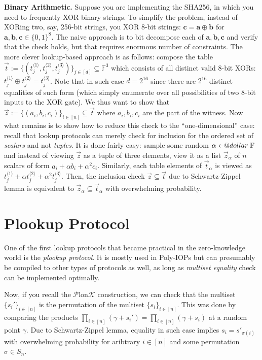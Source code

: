 \documentclass{lookup-template}
\makeatletter
\newcommand\leftarrowS{\leftarrow\joinrel\smalldollar}
\newcommand{\smalldollar}{\mathrel{\mathpalette\small@dollar\relax}}
\newcommand{\small@dollar}[2]{%
  \vcenter{\hbox{%
    $#1\textnormal{\fontsize{0.7\dimexpr\f@size pt}{0}\selectfont\$}$%
  }}%
}
\makeatother
\begin{document}
\textbf{Binary Arithmetic.} Suppose you are implementing the SHA256, in which
you need to frequently XOR binary strings. To simplify the problem, instead of
XORing two, say, 256-bit strings, you XOR 8-bit strings: $\mathbf{c} =
\mathbf{a} \oplus \mathbf{b}$ for $\mathbf{a},\mathbf{b},\mathbf{c} \in
\{0,1\}^8$. The naive approach is to bit decompose each of
$\mathbf{a},\mathbf{b},\mathbf{c}$ and verify that the check holds, but that
requires enormous number of constraints. The more clever lookup-based approach
is as follows: compose the table $\vec{t} := \{(t_j^{\langle 1
\rangle},t_j^{\langle 2 \rangle},t_j^{\langle 3 \rangle})\}_{j \in [d]}
\subseteq \mathbb{F}^3$ which consists of all distinct valid 8-bit XORs:
$t_j^{\langle 1 \rangle} \oplus t_j^{\langle 2 \rangle}=t_j^{\langle 3
\rangle}$. Note that in such case $d=2^{16}$ since there are $2^{16}$ distinct
equalities of such form (which simply enumerate over all possibilities of two
8-bit inputs to the XOR gate). We thus want to show that $\vec{z} :=
\{(a_i,b_i,c_i)\}_{i \in [n]} \subseteq \vec{t}$ where $a_i,b_i,c_i$ are the
part of the witness. Now what remains is to show how to reduce this check to the
``one-dimensional'' case: recall that lookup protocols can merely check for
inclusion for the ordered set of \textit{scalars} and not \textit{tuples}. It is
done fairly easy: sample some random $\alpha \leftarrowS \mathbb{F}$ and instead
of viewing $\vec{z}$ as a tuple of three elements, view it as a list
$\vec{z}_{\alpha}$ of $n$ scalars of form $a_i+\alpha b_i+\alpha^2 c_i$.
Similarly, each table elements of $\vec{t}_{\alpha}$ is viewed as $t_j^{\langle
1 \rangle} + \alpha t_j^{\langle 2 \rangle} + \alpha^2 t_j^{\langle 3 \rangle}$.
Then, the inclusion check $\vec{z} \subseteq \vec{t}$ due to Schwartz-Zippel
lemma is equivalent to $\vec{z}_{\alpha} \subseteq \vec{t}_{\alpha}$ with
overwhelming probability.

\section*{Plookup Protocol}

One of the first lookup protocols that became practical in the zero-knowledge
world is the \textit{plookup protocol}. It is mostly used in Poly-IOPs but can
presumably be compiled to other types of protocols as well, as long as
\textit{multiset equality} check can be implemented optimally.

Now, if you recall the $\mathcal{P}$lon$\mathcal{K}$ construction, we can check
that the multiset $\{s_i'\}_{i \in [n]}$ is the permutation of the multiset
$\{s_i\}_{i \in [n]}$. This was done by comparing the products $\prod_{i \in
[n]}(\gamma+s_i')=\prod_{i \in [n]}(\gamma+s_i)$ at a random point $\gamma$. Due
to Schwartz-Zippel lemma, equality in such case implies $s_{i}=s'_{\sigma(i)}$
with overwhelming probability for aribtrary $i \in [n]$ and some permutation $\sigma
\in S_n$.
\end{document}
